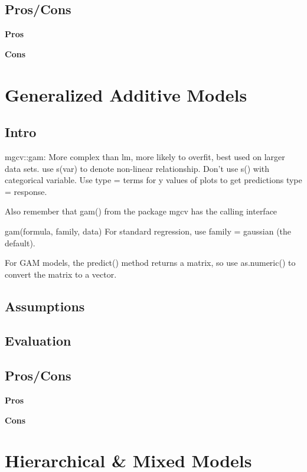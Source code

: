 \documentclass[]{book}
\theoremstyle{definition}
\theoremstyle{definition}
\theoremstyle{definition}
\theoremstyle{remark}
\begin{document}
\subsection{Pros/Cons}\label{proscons-3}

\textbf{Pros}

\textbf{Cons}

\section{Generalized Additive Models}\label{generalized-additive-models}

\subsection{Intro}\label{intro-4}

mgcv::gam: More complex than lm, more likely to overfit, best used on
larger data sets. use s(var) to denote non-linear relationship. Don't
use s() with categorical variable. Use type = terms for y values of
plots to get predictions type = response.

Also remember that gam() from the package mgcv has the calling interface

gam(formula, family, data) For standard regression, use family =
gaussian (the default).

For GAM models, the predict() method returns a matrix, so use
as.numeric() to convert the matrix to a vector.

\subsection{Assumptions}\label{assumptions-4}

\subsection{Evaluation}\label{evaluation-3}

\subsection{Pros/Cons}\label{proscons-4}

\textbf{Pros}

\textbf{Cons}

\section{Hierarchical \& Mixed Models}\label{hierarchical-mixed-models}
\end{document}
